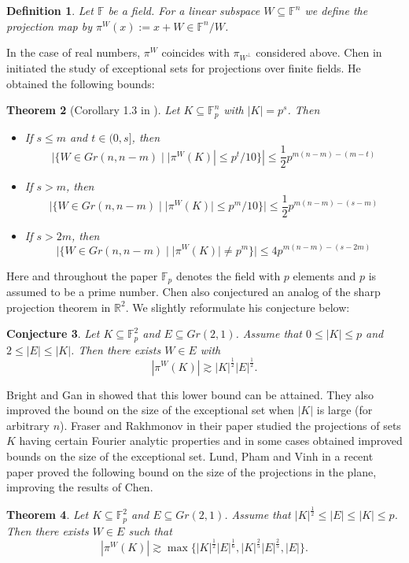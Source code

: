 \documentclass{amsart}
\newtheorem{theorem}{Theorem}[section]
\newtheorem{conjecture}[theorem]{Conjecture}
\newtheorem{definition}[theorem]{Definition}
\newcommand{\F}{\mathbb F}
\begin{document}
\begin{definition}
    Let $\F$ be a field. For a linear subspace $W \subseteq \F^n$ we define the projection map by $\pi^W(x) := x + W \in \F^n/W$. 
\end{definition}
In the case of real numbers, $\pi^{W}$ coincides with $\pi_{W^\bot}$ considered above. Chen in \cite{Che17} initiated the study of exceptional sets for projections over finite fields. He obtained the following bounds:
\begin{theorem}[Corollary 1.3 in \cite{Che17}] \label{ChenTheorem}
Let $K \subseteq \F_p^n$ with $|K| = p^s$. Then 
\begin{itemize}
    \item If $s \leq m$ and $t \in (0, s]$, then
    $$|\{W \in Gr(n, n - m) \mid |\pi^{W}(K)| \leq p^t/10\}| \leq \frac{1}{2}p^{m(n - m) - (m - t)}$$
    \item If $s > m$, then
    $$|\{W \in Gr(n, n - m) \mid |\pi^{W}(K)| \leq p^m/10\}| \leq \frac{1}{2}p^{m(n - m) - (s - m)}$$
    \item If $s > 2m$, then
    $$|\{W \in Gr(n, n - m) \mid |\pi^{W}(K)| \neq p^m\}| \leq 4p^{m(n - m) - (s - 2m)}$$
\end{itemize}
\end{theorem}
Here and throughout the paper $\F_p$ denotes the field with $p$ elements and $p$ is assumed to be a prime number. Chen also conjectured an analog of the sharp projection theorem in $\mathbb{R}^2$. We slightly reformulate his conjecture below:

\begin{conjecture}\label{planarConjecture}
    Let $K \subseteq \F_p^2$ and $E \subseteq Gr(2, 1)$. Assume that  $0 \leq |K| \leq p$ and $2 \leq |E| \leq |K|$. Then there exists $W \in E$ with $$|\pi^W(K)| \gtrsim |K|^\frac{1}{2}|E|^\frac{1}{2}.$$
\end{conjecture}

Bright and Gan in \cite{Bri23} showed that this lower bound can be attained. They also improved the bound on the size of the exceptional set when $|K|$ is large (for arbitrary $n$). Fraser and Rakhmonov in their paper \cite{Fra25} studied the projections of sets $K$ having certain Fourier analytic properties and in some cases obtained improved bounds on the size of the exceptional set. Lund, Pham and Vinh in a recent paper \cite{Lun23} proved the following bound on the size of the projections in the plane, improving the results of Chen.

\begin{theorem}\label{planarProjections}
    Let $K \subseteq \F_p^2$ and $E \subseteq Gr(2, 1)$. Assume that $|K|^\frac{1}{2} \leq |E| \leq |K| \leq p$. Then there exists $W \in E$ such that $$|\pi^W(K)| \gtrsim \max\{|K|^{\frac{1}{2}}|E|^{\frac{1}{6}}, |K|^\frac{2}{5}|E|^\frac{2}{5}, |E|\}.$$ 
\end{theorem}
\end{document}
